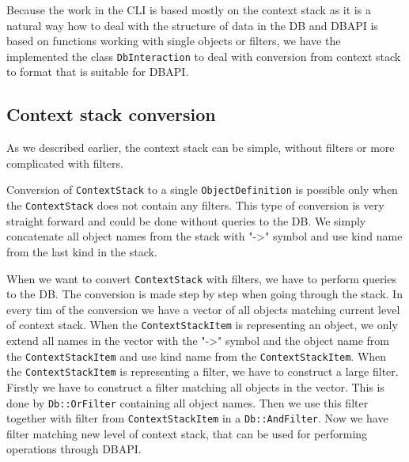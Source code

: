\documentclass[deska]{subfiles}
\begin{document}
Because the work in the CLI is based mostly on the context stack as it is a natural way how to deal with the structure
of data in the DB and DBAPI is based on functions working with single objects or filters, we have the implemented the
class {\tt DbInteraction} to deal with conversion from context stack to format that is suitable for DBAPI.

\subsection{Context stack conversion}

As we described earlier, the context stack can be simple, without filters or more complicated with filters.

Conversion of {\tt ContextStack} to a single {\tt ObjectDefinition} is possible only when the {\tt ContextStack} does
not contain any filters. This type of conversion is very straight forward and could be done without queries to the DB.
We simply concatenate all object names from the stack with "->" symbol and use kind name from the last kind in the stack.

When we want to convert {\tt ContextStack} with filters, we have to perform queries to the DB. The conversion is made
step by step when going through the stack. In every tim of the conversion we have a vector of all objects matching current
level of context stack. When the {\tt ContextStackItem} is representing an object, we only extend all names in the vector
with the "->" symbol and the object name from the {\tt ContextStackItem} and use kind name from the {\tt ContextStackItem}.
When the {\tt ContextStackItem} is representing a filter, we have to construct a large filter. Firstly we have to construct
a filter matching all objects in the vector. This is done by {\tt Db::OrFilter} containing all object names. Then we use
this filter together with filter from {\tt ContextStackItem} in a {\tt Db::AndFilter}. Now we have filter matching new
level of context stack, that can be used for performing operations through DBAPI.
\end{document}
